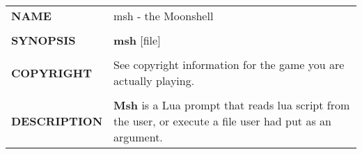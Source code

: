 \begin{tabularx}{\textwidth}{l X}
	\textbf{NAME} & msh - the Moonshell
	\\ \\
	\textbf{SYNOPSIS} & \textbf{msh} [file]
	\\ \\
	\textbf{COPYRIGHT} & See copyright information for the game you are actually playing.
	\\ \\
	\textbf{DESCRIPTION} & \textbf{Msh} is a Lua prompt that reads lua script from the user, or execute a file user had put as an argument.
\end{tabularx}